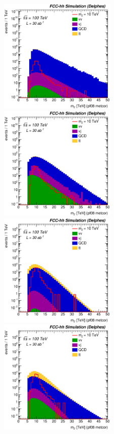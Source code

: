 \documentclass{cernrep}
\begin{document}
\begin{figure}[!htb]\centering
\includegraphics[width=0.495\textwidth]{Fig/Zptt/Mj1j2_pf08_MetCorr_fit_sel2_nostack_log.eps}
\includegraphics[width=0.495\textwidth]{Fig/Zptt/Mj1j2_pf08_MetCorr_fit_sel4_nostack_log.eps}
\includegraphics[width=0.495\textwidth]{Fig/Zptt/Mj1j2_pf08_MetCorr_fit_sel5_nostack_log.eps}
\includegraphics[width=0.495\textwidth]{Fig/Zptt/Mj1j2_pf08_MetCorr_fit_sel6_nostack_log.eps}

\end{figure}
\end{document}
